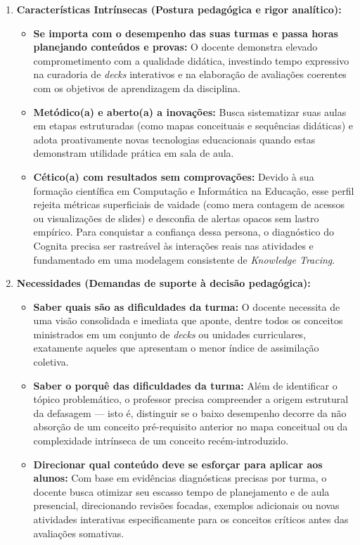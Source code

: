 \begin{enumerate}
    \item \textbf{Características Intrínsecas (Postura pedagógica e rigor analítico):}
    \begin{itemize}
        \item \textbf{Se importa com o desempenho das suas turmas e passa horas planejando conteúdos e provas:} O docente demonstra elevado comprometimento com a qualidade didática, investindo tempo expressivo na curadoria de \textit{decks} interativos e na elaboração de avaliações coerentes com os objetivos de aprendizagem da disciplina.
        \item \textbf{Metódico(a) e aberto(a) a inovações:} Busca sistematizar suas aulas em etapas estruturadas (como mapas conceituais e sequências didáticas) e adota proativamente novas tecnologias educacionais quando estas demonstram utilidade prática em sala de aula.
        \item \textbf{Cético(a) com resultados sem comprovações:} Devido à sua formação científica em Computação e Informática na Educação, esse perfil rejeita métricas superficiais de vaidade (como mera contagem de acessos ou visualizações de slides) e desconfia de alertas opacos sem lastro empírico. Para conquistar a confiança dessa persona, o diagnóstico do Cognita precisa ser rastreável às interações reais nas atividades e fundamentado em uma modelagem consistente de \textit{Knowledge Tracing}.
    \end{itemize}

    \item \textbf{Necessidades (Demandas de suporte à decisão pedagógica):}
    \begin{itemize}
        \item \textbf{Saber quais são as dificuldades da turma:} O docente necessita de uma visão consolidada e imediata que aponte, dentre todos os conceitos ministrados em um conjunto de \textit{decks} ou unidades curriculares, exatamente aqueles que apresentam o menor índice de assimilação coletiva.
        \item \textbf{Saber o porquê das dificuldades da turma:} Além de identificar o tópico problemático, o professor precisa compreender a origem estrutural da defasagem — isto é, distinguir se o baixo desempenho decorre da não absorção de um conceito pré-requisito anterior no mapa conceitual ou da complexidade intrínseca de um conceito recém-introduzido.
        \item \textbf{Direcionar qual conteúdo deve se esforçar para aplicar aos alunos:} Com base em evidências diagnósticas precisas por turma, o docente busca otimizar seu escasso tempo de planejamento e de aula presencial, direcionando revisões focadas, exemplos adicionais ou novas atividades interativas especificamente para os conceitos críticos antes das avaliações somativas.
    \end{itemize}
\end{enumerate}

